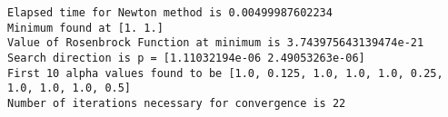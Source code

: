\documentclass[11pt]{article}
\begin{document}
    \begin{Verbatim}[commandchars=\\\{\}]
Elapsed time for Newton method is 0.00499987602234
Minimum found at [1. 1.]
Value of Rosenbrock Function at minimum is 3.743975643139474e-21
Search direction is p = [1.11032194e-06 2.49053263e-06]
First 10 alpha values found to be [1.0, 0.125, 1.0, 1.0, 1.0, 0.25, 1.0, 1.0, 1.0, 0.5]
Number of iterations necessary for convergence is 22

    \end{Verbatim}


    
    
    
    
\end{document}
